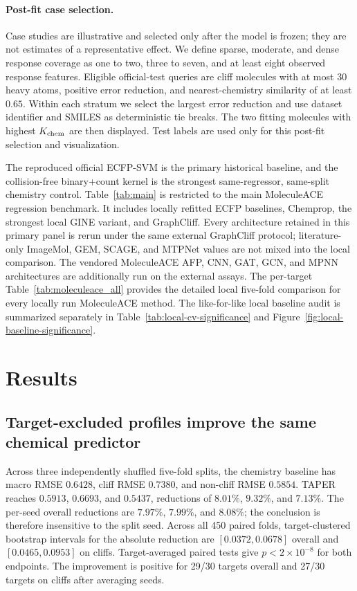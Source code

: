 \documentclass[manuscript,nonacm]{acmart}
\newcommand{\method}{TAPER\xspace}
\newcommand{\mace}{MoleculeACE\xspace}
\begin{document}
\paragraph{Post-fit case selection.}
Case studies are illustrative and selected only after the model is frozen;
they are not estimates of a representative effect. We define sparse, moderate,
and dense response coverage as one to two, three to seven, and at least eight
observed response features. Eligible official-test queries are cliff molecules
with at most 30 heavy atoms, positive error reduction, and nearest-chemistry
similarity of at least $0.65$. Within each stratum we select the largest error
reduction and use dataset identifier and SMILES as deterministic tie breaks.
The two fitting molecules with highest $K_{\rm chem}$ are then displayed.
Test labels are used only for this post-fit selection and visualization.

The reproduced official ECFP-SVM is the primary historical baseline, and the
collision-free binary+count kernel is the strongest same-regressor, same-split
chemistry control. Table~\ref{tab:main} is restricted to the main \mace
regression benchmark. It includes locally refitted ECFP baselines, Chemprop,
the strongest local GINE variant, and GraphCliff. Every architecture retained
in this primary panel is rerun under the same external GraphCliff protocol;
literature-only ImageMol, GEM, SCAGE, and MTPNet values are not mixed into the
local comparison. The vendored MoleculeACE AFP, CNN, GAT, GCN, and MPNN
architectures are additionally run on the external assays. The
per-target Table~\ref{tab:moleculeace_all} provides the detailed local
five-fold comparison for every locally run MoleculeACE method. The like-for-like
local baseline audit is summarized separately in
Table~\ref{tab:local-cv-significance} and
Figure~\ref{fig:local-baseline-significance}.



\section{Results}
\subsection{Target-excluded profiles improve the same chemical predictor}
Across three independently shuffled five-fold splits, the chemistry baseline
has macro RMSE $0.6428$, cliff RMSE $0.7380$, and non-cliff RMSE $0.5854$.
\method reaches $0.5913$, $0.6693$, and $0.5437$, reductions of $8.01\%$,
$9.32\%$, and $7.13\%$. The per-seed overall reductions are $7.97\%$,
$7.99\%$, and $8.08\%$; the conclusion is therefore insensitive to the split
seed. Across all 450 paired folds, target-clustered
bootstrap intervals for the absolute reduction are $[0.0372,0.0678]$ overall
and $[0.0465,0.0953]$ on cliffs. Target-averaged paired tests give
$p<2\times10^{-8}$ for both endpoints. The improvement is positive for 29/30
targets overall and 27/30 targets on cliffs after averaging seeds.
\end{document}
